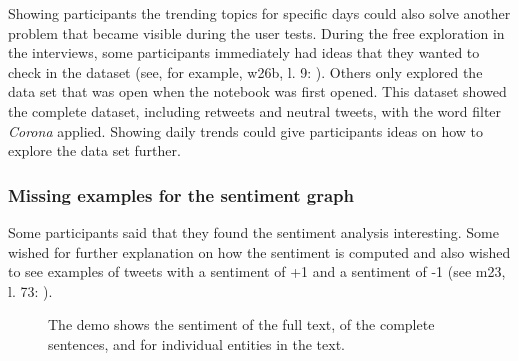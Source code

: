 Showing participants the trending topics for specific days could also solve another problem that became visible during the user tests. During the free exploration in the interviews, some participants immediately had ideas that they wanted to check in the dataset (see, for example, w26b, l. 9: ). Others only explored the data set that was open when the notebook was first opened. This dataset showed the complete dataset, including retweets and neutral tweets, with the word filter \emph{Corona} applied. Showing daily trends could give participants ideas on how to explore the data set further.

\subsubsection*{Missing examples for the sentiment graph}\label{sec:missingExamples}
Some participants said that they found the sentiment analysis interesting. Some wished for further explanation on how the sentiment is computed and also wished to see examples of tweets with a sentiment of +1 and a sentiment of -1 (see m23, l. 73: ).

\begin{figure}[htb!]
    \centering
    \caption{The demo shows the sentiment of the full text, of the complete sentences, and for individual entities in the text.}
    \label{fig:sentiment_google}
\end{figure}

